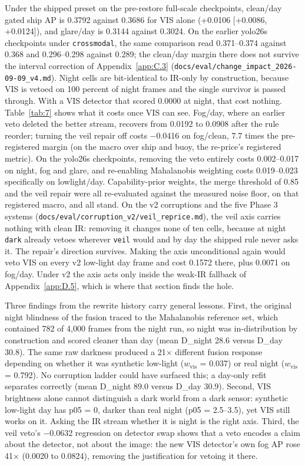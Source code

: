 \documentclass[10pt]{article}
\begin{document}
Under the shipped preset on the pre-restore full-scale checkpoints, clean/day gated ship AP is 0.3792 against 0.3686 for VIS alone (+0.0106 [+0.0086, +0.0124]), and glare/day is 0.3144 against 0.3024. On the earlier yolo26s checkpoints under \texttt{crossmodal}, the same comparison read 0.371--0.374 against 0.368 and 0.296--0.298 against 0.289; the clean/day margin there does not survive the interval correction of Appendix~\ref{app:C.3} (\texttt{docs/\allowbreak{}eval/\allowbreak{}change\_\allowbreak{}impact\_\allowbreak{}2026-09-09\_\allowbreak{}v4.md}). Night cells are bit-identical to IR-only by construction, because VIS is vetoed on 100 percent of night frames and the single survivor is passed through. With a VIS detector that scored 0.0000 at night, that cost nothing. Table~\ref{tab:7} shows what it costs once VIS can see. Fog/day, where an earlier veto deleted the better stream, recovers from 0.0192 to 0.0908 after the rule reorder; turning the veil repair off costs $-$0.0416 on fog/clean, 7.7 times the pre-registered margin (on the macro over ship and buoy, the re-price's registered metric). On the yolo26s checkpoints, removing the veto entirely costs 0.002--0.017 on night, fog and glare, and re-enabling Mahalanobis weighting costs 0.019--0.023 specifically on lowlight/day. Capability-prior weights, the merge threshold of 0.85 and the veil repair were all re-evaluated against the measured noise floor, on that registered macro, and all stand. On the v2 corruptions and the five Phase 3 systems (\texttt{docs/\allowbreak{}eval/\allowbreak{}corruption\_\allowbreak{}v2/\allowbreak{}veil\_\allowbreak{}reprice.md}), the veil axis carries nothing with clean IR: removing it changes none of ten cells, because at night \texttt{dark} already vetoes wherever \texttt{veil} would and by day the shipped rule never asks it. The repair's direction survives. Making the axis unconditional again would veto VIS on every v2 low-light day frame and cost 0.1572 there, plus 0.0071 on fog/day. Under v2 the axis acts only inside the weak-IR fallback of Appendix~\ref{app:D.5}, which is where that section finds the hole.

Three findings from the rewrite history carry general lessons. First, the original night blindness of the fusion traced to the Mahalanobis reference set, which contained 782 of 4,000 frames from the night run, so night was in-distribution by construction and scored cleaner than day (mean D\_night 28.6 versus D\_day 30.8). The same raw darkness produced a 21$\times$ different fusion response depending on whether it was synthetic low-light ($w_{\mathrm{vis}}$ = 0.037) or real night ($w_{\mathrm{vis}}$ = 0.792). No corruption ladder could have surfaced this; a day-only refit separates correctly (mean D\_night 89.0 versus D\_day 30.9). Second, VIS brightness alone cannot distinguish a dark world from a dark sensor: synthetic low-light day has p05 = 0, darker than real night (p05 = 2.5--3.5), yet VIS still works on it. Asking the IR stream whether it is night is the right axis. Third, the veil veto's $-$0.0632 regression on detector swap shows that a veto encodes a claim about the detector, not about the image: the new VIS detector's own fog AP rose 41$\times$ (0.0020 to 0.0824), removing the justification for vetoing it there.
\end{document}
